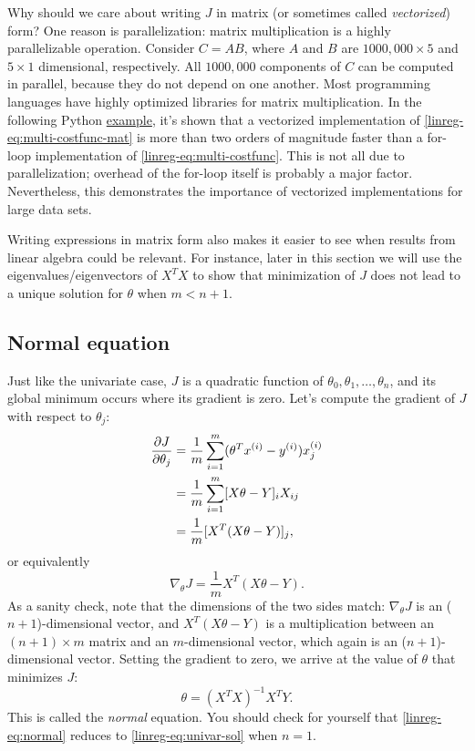 \documentclass{article}
\theoremstyle{definition}
\begin{document}
Why should we care about writing $J$ in matrix (or sometimes called \textit{vectorized}) form? One reason is parallelization: matrix multiplication is a highly parallelizable operation. Consider $C=AB$, where $A$ and $B$ are $1000,000 \times 5$ and $5 \times 1$ dimensional, respectively. All $1000,000$ components of $C$ can be computed in parallel, because they do not depend on one another. Most programming languages have highly optimized libraries for matrix multiplication. In the following Python \href{https://github.com/siavashaslanbeigi/machine_learning/blob/master/lin_reg/matrix.ipynb}{\color{blue} example}, it's shown that a vectorized implementation of \eqref{linreg-eq:multi-costfunc-mat} is more than two orders of magnitude faster than a for-loop implementation of \eqref{linreg-eq:multi-costfunc}. This is not all due to parallelization; overhead of the for-loop itself is probably a major factor. Nevertheless, this demonstrates the importance of vectorized implementations for large data sets.

Writing expressions in matrix form also makes it easier to see when results from linear algebra could be relevant. For instance, later in this section we will use the eigenvalues/eigenvectors of $X^TX$ to show that minimization of $J$ does not lead to a unique solution for $\theta$ when $m<n+1$.


\subsection{Normal equation}
\label{linreg-sec:normaleq}
Just like the univariate case, $J$ is a quadratic function of $\theta_0, \theta_1, \dots, \theta_n$, and its global minimum occurs where its gradient is zero. Let's compute the gradient of $J$ with respect to $\theta_j$:
\begin{align}
    \frac{\partial J}{\partial \theta_j} &= \frac{1}{m}\sum_{i=1}^{m}(\theta^Tx^{(i)} - y^{(i)})x^{(i)}_j\notag\\
    &=\frac{1}{m}\sum_{i=1}^{m}[X\theta - Y]_iX_{ij}\notag\\
    &=\frac{1}{m}[X^T(X\theta - Y)]_j,\label{linreg-eq:costfunc-mat}
\end{align}
or equivalently
\begin{equation}
    \nabla_{\theta} J = \frac{1}{m}X^T(X\theta - Y).
\end{equation}
As a sanity check, note that the dimensions of the two sides match: $\nabla_{\theta} J$ is an ($n+1$)-dimensional vector, and $X^T(X\theta - Y)$ is a multiplication between an $(n+1) \times m$ matrix and an $m$-dimensional vector, which again is an ($n+1$)-dimensional vector. Setting the gradient to zero, we arrive at the value of $\theta$ that minimizes $J$:
\begin{equation}
    \theta = \left(X^TX\right)^{-1}X^TY.
    \label{linreg-eq:normal}
\end{equation}
This is called the \textit{normal} equation. You should check for yourself that \eqref{linreg-eq:normal} reduces to \eqref{linreg-eq:univar-sol} when $n = 1$.
\end{document}
